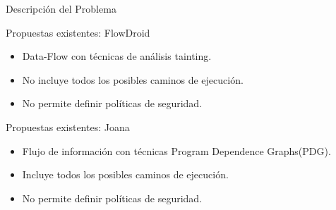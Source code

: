 \begin{frame}{Descripción del Problema}
\begin{block}{Propuestas existentes: FlowDroid}
\begin{itemize}
	  \item Data-Flow con técnicas de análisis tainting.
	  \item No incluye todos los posibles caminos de ejecución.
	  \item No permite definir políticas de seguridad.
\end{itemize}
\end{block}
\pause
\begin{block}{Propuestas existentes: Joana}
\begin{itemize}
  	  \item Flujo de información con técnicas Program Dependence Graphs(PDG). 
	  \item Incluye todos los posibles caminos de ejecución.
	  \item No permite definir políticas de seguridad.
\end{itemize}
\end{block}
\end{frame}

